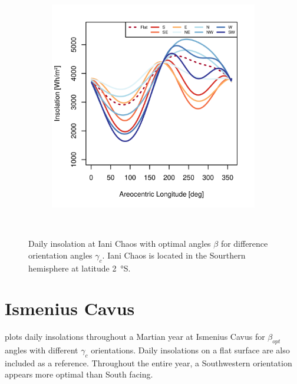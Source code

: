 \begin{figure}[h]
\begin{subfigure}[t]{\subfigureWidth}
            \includegraphics[height=\graphicsHeight]{sections/appendix/optimal-angles/plots/iani-chaos-tau-04-and-beta-optimal-based-on-solar-insolation.png}
            \label{fig:sub:optimal-angles-iani-chaos-based-on-insolation}
    \end{subfigure}\\[0.8ex]
    \caption[Daily insolation at Iani Chaos with optimal angles $\beta$ for difference orientation angles $\gamma_c$]
    {Daily insolation at Iani Chaos with optimal angles $\beta$ for difference orientation angles $\gamma_c$. Iani Chaos is located in the Sourthern hemisphere at latitude \SI{2}{\degree}S.}
    \label{fig:plot:optimal-angles-iani-chaos}
\vspace{-2ex}
\end{figure}

\section{Ismenius Cavus}

 plots daily insolations throughout a Martian year at Ismenius Cavus for $\beta_{opt}$ angles with different $\gamma_{c}$ orientations. Daily insolations on a flat surface are also included as a reference. Throughout the entire year, a Southwestern orientation appears more optimal than South facing.

